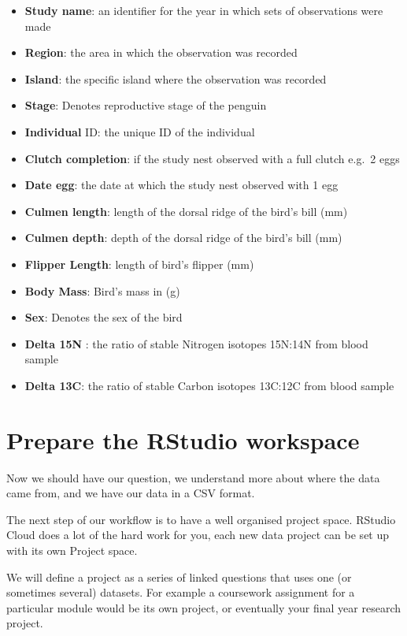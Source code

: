 \documentclass[
]{book}
\begin{document}
\begin{itemize}
\item
  \textbf{Study name}: an identifier for the year in which sets of observations were made
\item
  \textbf{Region}: the area in which the observation was recorded
\item
  \textbf{Island}: the specific island where the observation was recorded
\item
  \textbf{Stage}: Denotes reproductive stage of the penguin
\item
  \textbf{Individual} ID: the unique ID of the individual
\item
  \textbf{Clutch completion}: if the study nest observed with a full clutch e.g.~2 eggs
\item
  \textbf{Date egg}: the date at which the study nest observed with 1 egg
\item
  \textbf{Culmen length}: length of the dorsal ridge of the bird's bill (mm)
\item
  \textbf{Culmen depth}: depth of the dorsal ridge of the bird's bill (mm)
\item
  \textbf{Flipper Length}: length of bird's flipper (mm)
\item
  \textbf{Body Mass}: Bird's mass in (g)
\item
  \textbf{Sex}: Denotes the sex of the bird
\item
  \textbf{Delta 15N} : the ratio of stable Nitrogen isotopes 15N:14N from blood sample
\item
  \textbf{Delta 13C}: the ratio of stable Carbon isotopes 13C:12C from blood sample
\end{itemize}

\hypertarget{prepare-the-rstudio-workspace}{%
\section{Prepare the RStudio workspace}\label{prepare-the-rstudio-workspace}}

Now we should have our question, we understand more about where the data came from, and we have our data in a CSV format.

The next step of our workflow is to have a well organised project space. RStudio Cloud does a lot of the hard work for you, each new data project can be set up with its own Project space.

We will define a project as a series of linked questions that uses one (or sometimes several) datasets. For example a coursework assignment for a particular module would be its own project, or eventually your final year research project.
\end{document}
